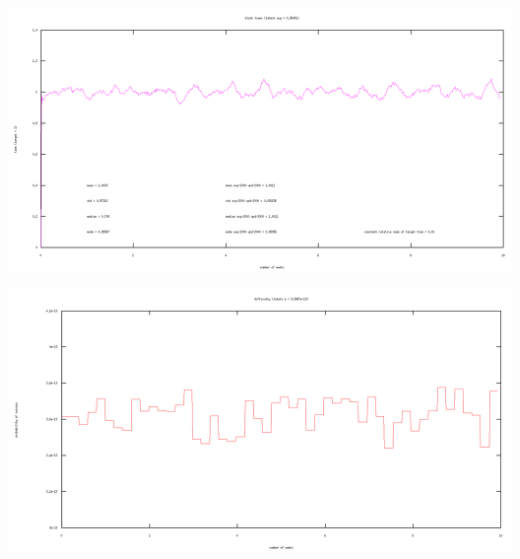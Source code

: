 \documentclass[10pt,a4paper]{article}
\begin{document}
\includegraphics[width=14cm]{Diagrams/SimulationGraphs/simulation_avg-2000_upd-2000_btc.png}

\includegraphics[width=14cm]{Diagrams/SimulationGraphs/simulation_avg-2000_upd-2000_btc_diff.png}
\end{document}

